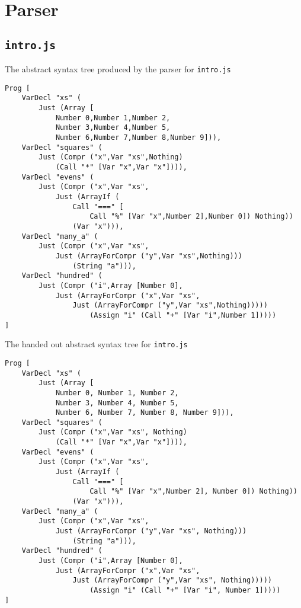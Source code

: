 \documentclass[a4paper]{article}
\begin{document}
\newpage
\appendix

\section{Parser}
\subsection{\texttt{intro.js}}
\label{A1}
The abstract syntax tree produced by the parser for \texttt{intro.js}
\begin{verbatim}
Prog [
    VarDecl "xs" (
        Just (Array [
            Number 0,Number 1,Number 2,
            Number 3,Number 4,Number 5,
            Number 6,Number 7,Number 8,Number 9])),
    VarDecl "squares" (
        Just (Compr ("x",Var "xs",Nothing)
            (Call "*" [Var "x",Var "x"]))),
    VarDecl "evens" (
        Just (Compr ("x",Var "xs",
            Just (ArrayIf (
                Call "===" [
                    Call "%" [Var "x",Number 2],Number 0]) Nothing))
                (Var "x"))),
    VarDecl "many_a" (
        Just (Compr ("x",Var "xs",
            Just (ArrayForCompr ("y",Var "xs",Nothing)))
                (String "a"))),
    VarDecl "hundred" (
        Just (Compr ("i",Array [Number 0],
            Just (ArrayForCompr ("x",Var "xs",
                Just (ArrayForCompr ("y",Var "xs",Nothing)))))
                    (Assign "i" (Call "+" [Var "i",Number 1]))))
]
\end{verbatim}
The handed out abstract syntax tree for \texttt{intro.js}
\begin{verbatim}
Prog [
    VarDecl "xs" (
        Just (Array [
            Number 0, Number 1, Number 2,
            Number 3, Number 4, Number 5,
            Number 6, Number 7, Number 8, Number 9])),
    VarDecl "squares" (
        Just (Compr ("x",Var "xs", Nothing)
            (Call "*" [Var "x",Var "x"]))),
    VarDecl "evens" (
        Just (Compr ("x",Var "xs",
            Just (ArrayIf (
                Call "===" [
                    Call "%" [Var "x",Number 2], Number 0]) Nothing))
                (Var "x"))),
    VarDecl "many_a" (
        Just (Compr ("x",Var "xs",
            Just (ArrayForCompr ("y",Var "xs", Nothing)))
                (String "a"))),
    VarDecl "hundred" (
        Just (Compr ("i",Array [Number 0],
            Just (ArrayForCompr ("x",Var "xs",
                Just (ArrayForCompr ("y",Var "xs", Nothing)))))
                    (Assign "i" (Call "+" [Var "i", Number 1]))))
]
\end{verbatim}
\end{document}
